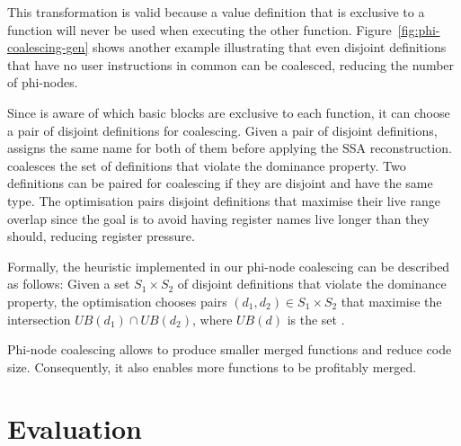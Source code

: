 This transformation is valid because a value definition that
is exclusive to a function will never be used when executing
the other function.
Figure~\ref{fig:phi-coalescing-gen} shows another example
illustrating that even disjoint definitions that have no user instructions
in common can be coalesced, reducing the number of phi-nodes.

Since {\ProjName} is aware of which basic blocks are exclusive to each function, it can choose a pair of disjoint definitions for
coalescing. Given a pair of disjoint definitions, {\ProjName} assigns the same name for both of them before applying the SSA
reconstruction. {\ProjName} coalesces the set of definitions that violate the dominance property. Two definitions can be paired for
coalescing if they are disjoint and have the same type. The optimisation pairs disjoint definitions that maximise their live range overlap
since the goal is to avoid having register names live longer than they should, reducing register pressure.

Formally, the heuristic implemented in our phi-node coalescing can be described as follows:
Given a set $S_1\times S_2$ of disjoint definitions that violate the dominance property,
the optimisation chooses pairs $(d_1,d_2)\in S_1\times S_2$ that maximise the intersection $U\!B(d_1)\cap U\!B(d_2)$,
where $U\!B(d)$ is the set .

Phi-node coalescing allows {\ProjName} to produce smaller merged functions and reduce code size.
Consequently, it also enables more functions to be profitably merged.

\section{Evaluation}



